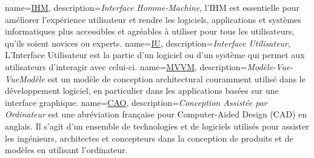 {
	name=\underline{IHM},
	description={\textit{Interface Homme-Machine}, l'IHM est essentielle pour améliorer l'expérience utilisateur et rendre les logiciels, applications et systèmes informatiques plus accessibles et agréables à utiliser pour tous les utilisateurs, qu'ils soient novices ou experts.}
}
{
	name=\underline{IU},
	description={\textit{Interface Utilisateur}, L'Interface Utilisateur est la partie d'un logiciel ou d'un système qui permet aux utilisateurs d'interagir avec celui-ci.}
}
{
	name=\underline{MVVM},
	description={\textit{Modèle-Vue-VueModèle} est un modèle de conception architectural couramment utilisé dans le développement logiciel, en particulier dans les applications basées sur une interface graphique.}
}
{
	name=\underline{CAO},
	description={\textit{Conception Assistée par Ordinateur} est une abréviation française pour Computer-Aided Design (CAD) en anglais. Il s'agit d'un ensemble de technologies et de logiciels utilisés pour assister les ingénieurs, architectes et concepteurs dans la conception de produits et de modèles en utilisant l'ordinateur.}
}
\glsaddall